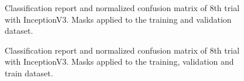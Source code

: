 \documentclass{article}
\begin{document}
\begin{figure}%
  \centering
  \qquad
  \caption{Classification report and normalized confusion matrix of 8th trial with InceptionV3. Masks applied to the training and validation dataset.}
  \label{fig:inceptionv3_12_results}
\end{figure}

\begin{figure}%
  \centering
  \qquad
  \caption{Classification report and normalized confusion matrix of 8th trial with InceptionV3. Masks applied to the training, validation and train dataset.}
  \label{fig:inceptionv3_13_results}
\end{figure}
\end{document}

